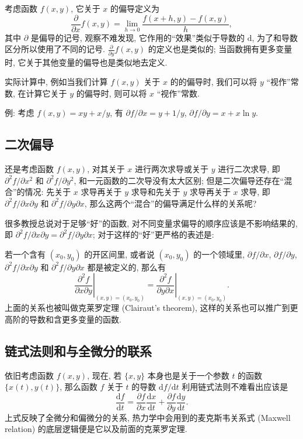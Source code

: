 考虑函数 \(f(x,y)\), 它关于 \(x\) 的偏导定义为 \[
\frac{\partial}{\partial x}f(x,y)=\lim_{h\rightarrow0}\frac{f(x+h,y)-f(x,y)}{h},
\] 其中 \(\partial\) 是偏导的记号, 观察不难发现,
它作用的``效果''类似于导数的 \(\mathrm{d}\),
为了和导数区分所以使用了不同的记号.
\(\frac{\partial}{\partial y}f(x,y)\) 的定义也是类似的;
当函数拥有更多变量时, 它关于其他变量的偏导也是类似地去定义.

\begin{newquote}
实际计算中, 例如当我们计算 \(f(x,y)\) 关于 \(x\) 的的偏导时, 我们可以将
\(y\) ``视作''常数, 在计算它关于 \(y\) 的偏导时, 则可以将 \(x\)
``视作''常数.

例: 考虑 \(f(x,y)=xy+x/y\), 有 \(\partial f/\partial x=y+1/y\),
\(\partial f/\partial y=x+x\ln y\).
\end{newquote}

\subsection{二次偏导}

还是考虑函数 \(f(x,y)\), 对其关于 \(x\) 进行两次求导或关于 \(y\)
进行二次求导, 即 \(\partial^2f/\partial x^2\) 和
\(\partial^2f/\partial y^2\), 和一元函数的二次导没有太大区别;
但是二次偏导还存在``混合''的情况: 先关于 \(x\) 求导再关于 \(y\)
求导和先关于 \(y\) 求导再关于 \(x\) 求导, 即
\(\partial^2f/\partial x\partial y\) 和
\(\partial^2f/\partial y\partial x\),
那么这两个``混合''的偏导满足什么样的关系呢?

很多教授总说对于足够``好''的函数,
对不同变量求偏导的顺序应该是不影响结果的, 即
\(\partial^2f/\partial x\partial y=\partial^2f/\partial y\partial x\);
对于这样的``好''更严格的表述是:

若一个含有 \((x_0,y_0)\) 的开区间里, 或者说 \((x_0,y_0)\) 的一个领域里,
\(\partial f/\partial x\), \(\partial f/\partial y\),
\(\partial^2f/\partial x\partial y\) 和
\(\partial^2f/\partial y\partial x\) 都是被定义的, 那么有 \[
\left.\frac{\partial^2f}{\partial x\partial y}\right|_{(x,y)=(x_0,y_0)}=\left.\frac{\partial^2f}{\partial y\partial x}\right|_{(x,y)=(x_0,y_0)}.
\] 上面的关系也被叫做克莱罗定理 (Clairaut's theorem),
这样的关系也可以推广到更高阶的导数和含更多变量的函数.

\subsection{链式法则和与全微分的联系}

依旧考虑函数 \(f(x,y)\), 现在, 若 \(\{x,y\}\) 本身也是关于一个参数 \(t\)
的函数 \(\{x(t),y(t)\}\), 那么函数 \(f\) 关于 \(t\) 的导数
\(\mathrm{d}f/\mathrm{d}t\) 利用链式法则不难看出应该是 \[
\boxed{\frac{\mathrm{d}f}{\mathrm{d}t}=\frac{\partial f}{\partial x}\frac{\mathrm{d}x}{\mathrm{d}t}+\frac{\partial f}{\partial y}\frac{\mathrm{d}y}{\mathrm{d}t}}.
\] 上式反映了全微分和偏微分的关系, 热力学中会用到的麦克斯韦关系式
(Maxwell relation) 的底层逻辑便是它以及前面的克莱罗定理.
